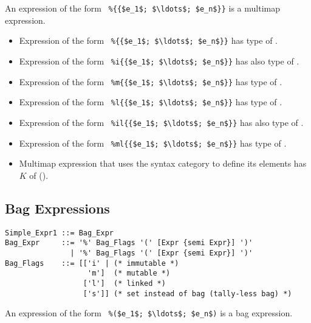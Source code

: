 An expression of the form ~\lstinline!%{{$e_1$; $\ldots$; $e_n$}}! is a multimap expression. 

\begin{itemize}
  \item Expression of the form ~\lstinline!%{{$e_1$; $\ldots$; $e_n$}}!
    has type of . 
  \item Expression of the form ~\lstinline!%i{{$e_1$; $\ldots$; $e_n$}}!
    has also type of . 
  \item Expression of the form ~\lstinline!%m{{$e_1$; $\ldots$; $e_n$}}!
    has type of .
  \item Expression of the form ~\lstinline!%l{{$e_1$; $\ldots$; $e_n$}}!
    has type of . 
  \item Expression of the form ~\lstinline!%il{{$e_1$; $\ldots$; $e_n$}}!
    has also type of . 
  \item Expression of the form ~\lstinline!%ml{{$e_1$; $\ldots$; $e_n$}}!
    has type of .
  \item Multimap expression that uses the  syntax category to define its elements has $K$ of  (). 
\end{itemize}






\subsection{Bag Expressions}
\label{sec:bag-expressions}

\syntax\begin{lstlisting}
Simple_Expr1 ::= Bag_Expr
Bag_Expr     ::= '%' Bag_Flags '(' [Expr {semi Expr}] ')'
               | '%' Bag_Flags '(' [Expr {semi Expr}] ')'
Bag_Flags    ::= [['i' | (* immutable *)
                   'm']  (* mutable *)
                  ['l']  (* linked *)
                  ['s']] (* set instead of bag (tally-less bag) *)
\end{lstlisting}

An expression of the form ~\lstinline!%($e_1$; $\ldots$; $e_n$)! is a bag expression. 

